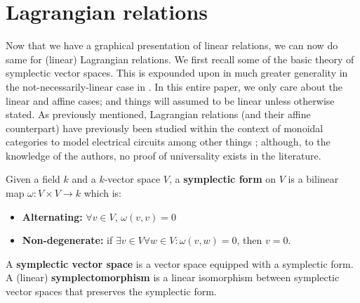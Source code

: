 



\section{Lagrangian relations}
\label{sec:sym}

Now that we have a graphical presentation of linear relations, we can now do same for (linear) Lagrangian relations.  We first recall some of the basic theory of symplectic vector spaces.  This is expounded upon in much greater generality in the not-necessarily-linear case in \cite{weinstein}.  In this entire paper, we only care about the linear and affine cases; and things will assumed to be linear unless otherwise stated.  As previously mentioned, Lagrangian relations (and their affine counterpart) have previously been studied within the context of monoidal categories  to model electrical circuits among other things \cite{passive,network,coya}; although, to the knowledge of the authors, no proof of universality exists in the literature.

\begin{definition}
  Given a field  $k$ and a $k$-vector space $V$, a {\bf symplectic form} on $V$ is a bilinear map $\omega:V\times V\to k$ which is:
\begin{itemize}
 \item {\bf Alternating:} $\forall v \in V$, $\omega(v,v)=0$ \item {\bf Non-degenerate:} if $\exists v \in V \forall w \in V: \omega(v,w)=0$, then $v=0$.
\end{itemize}
  A {\bf symplectic vector space} is a vector space equipped with a symplectic form. A (linear) {\bf symplectomorphism} is a linear isomorphism between symplectic vector spaces that preserves the symplectic form.
\end{definition}


